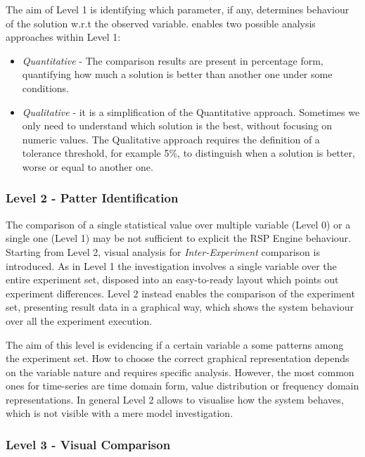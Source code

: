 The aim of Level 1 is identifying which parameter, if any, determines behaviour of the solution w.r.t the observed variable. \name enables two possible analysis approaches within Level 1:
\begin{itemize}
\item \textit{Quantitative} -  The comparison results are present in percentage form, quantifying how much a solution is better than another one under some conditions. 
\item \textit{Qualitative} - it is a simplification of the Quantitative approach. Sometimes we only need to understand which solution is the best, without focusing on numeric values. The Qualitative approach requires the definition of a tolerance threshold, for example 5\%, to distinguish when a solution is better, worse or equal to another one.
\end{itemize}

\subsubsection{Level 2 - Patter Identification}\label{sec:heaven-level2}

The comparison of a single statistical value over multiple variable (Level 0) or a single one (Level 1) may be not sufficient to explicit the RSP Engine behaviour. Starting from Level 2, visual analysis for \textit{Inter-Experiment} comparison is introduced. As in Level 1 the investigation involves a single variable over the entire experiment set, disposed into an easy-to-ready layout which points out experiment differences. Level 2 instead enables the comparison of the experiment set, presenting result data in a graphical way, which shows the system behaviour over all the experiment execution.

The aim of this level is evidencing if a certain variable a some patterns among the experiment set. How to choose the correct graphical representation depends on the variable nature and requires specific analysis. However, the most common ones for time-series are time domain form, value distribution or frequency domain representations. In general Level 2 allows to visualise how the system behaves, which is not visible with a mere model investigation.

\subsubsection{Level 3 - Visual Comparison}\label{sec:heaven-level3}

